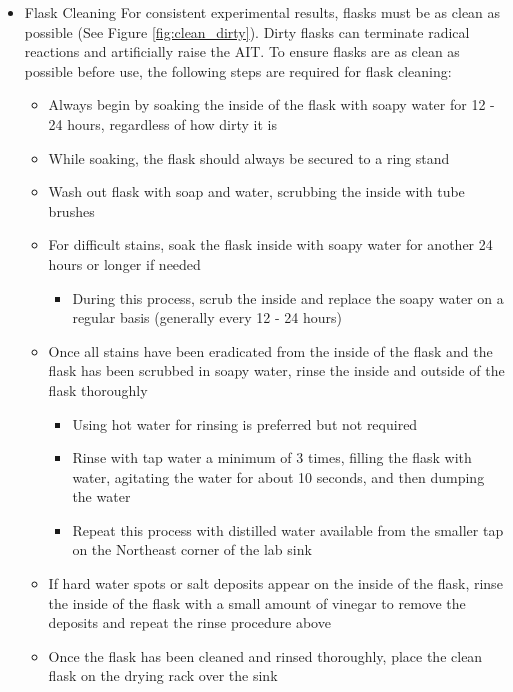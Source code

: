 \documentclass[letterpaper,11pt]{article}
\begin{document}
\begin{itemize}
    \item Flask Cleaning \newline
        For consistent experimental results, flasks must be as clean as possible
        (See Figure \ref{fig:clean_dirty}). Dirty flasks can terminate radical 
        reactions and artificially raise the AIT. To ensure flasks are as clean 
        as possible before use, the following steps are required for flask 
        cleaning:
        \begin{itemize}
                \item Always begin by soaking the inside of the flask with soapy water 
            for 12 - 24 hours, regardless of how dirty it is
        \item While soaking, the flask should always be secured to a ring stand
        \item Wash out flask with soap and water, scrubbing the inside with 
            tube brushes
        \item For difficult stains, soak the flask inside with soapy water for 
            another 24 hours or longer if needed 
            \begin{itemize}
            \item During this process, scrub the inside and replace the 
                soapy water on a regular basis (generally every 12 - 24 hours)
            \end{itemize}
        
        \item Once all stains have been eradicated from the inside of the flask
            and the flask has been scrubbed in soapy water, rinse the inside and
            outside of the flask thoroughly
            \begin{itemize}
            \item Using hot water for rinsing is preferred but not required
            \item Rinse with tap water a minimum of 3 times, filling the flask
                with water, agitating the water for about 10 seconds, and then 
                dumping the water
            \item Repeat this process with distilled water available from the 
                smaller tap on the Northeast corner of the lab sink
            \end{itemize}
        
        \item If hard water spots or salt deposits appear on the inside of the 
            flask, rinse the inside of the flask with a small amount of vinegar
            to remove the deposits and repeat the rinse procedure above
        \item Once the flask has been cleaned and rinsed thoroughly, place the 
            clean flask on the drying rack over the sink
        \end{itemize}        
    \end{itemize}
\end{document}
